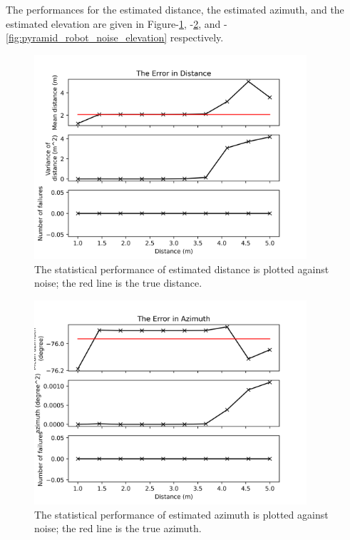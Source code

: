 \documentclass[notitlepage]{report}
\begin{document}
The performances for the estimated distance, the estimated azimuth, and the estimated elevation are given in Figure-\ref{fig:pyramid_robot_noise_distance}, -\ref{fig:pyramid_robot_noise_azimuth}, and -\ref{fig:pyramid_robot_noise_elevation} respectively.


\begin{figure}[H]
\includegraphics[width=0.9\textwidth]{../Python/pyramid_robot/noise/distance.png}
\centering
\caption{The statistical performance of estimated distance is plotted against noise; the red line is the true distance.}
\label{fig:pyramid_robot_noise_distance}
\centering
\end{figure}

\begin{figure}[H]
\includegraphics[width=0.9\textwidth]{../Python/pyramid_robot/noise/azimuth.png}
\centering
\caption{The statistical performance of estimated azimuth is plotted against noise; the red line is the true azimuth.}
\label{fig:pyramid_robot_noise_azimuth}
\centering
\end{figure}
\end{document}
